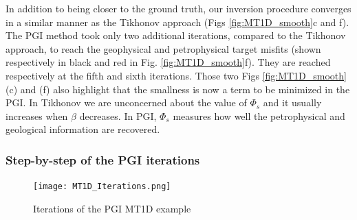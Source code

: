 \documentclass[extra]{gji} %
\begin{document}
In addition to being closer to the ground truth, our inversion procedure converges in a similar manner as the Tikhonov approach (Figs \ref{fig:MT1D_smooth}c and f). The PGI method took only two additional iterations, compared to the Tikhonov approach, to reach the geophysical and petrophysical target misfits (shown respectively in black and red in Fig. \ref{fig:MT1D_smooth}f). They are reached respectively at the fifth and sixth iterations. Those two Figs \ref{fig:MT1D_smooth}(c) and (f) also highlight that the smallness is now a term to be minimized in the PGI. In Tikhonov we are unconcerned about the value of $\Phi_s$ and it usually increases when $\beta$ decreases. In PGI, $\Phi_s$ measures how well the petrophysical and geological information are recovered.

\subsubsection{Step-by-step of the PGI iterations}

\begin{figure}
\centering
\texttt{[image: MT1D\_Iterations.png]}
\caption[]{Iterations of the PGI MT1D example}
\label{fig:MT1D_Iterations}
\end{figure}
\end{document}
